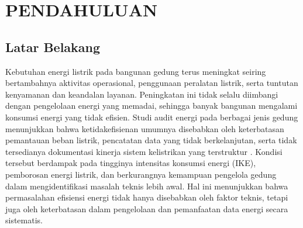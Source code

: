\chapter{PENDAHULUAN}
\label{chap:pendahuluan}
\section{Latar Belakang}
Kebutuhan energi listrik pada bangunan gedung terus meningkat seiring bertambahnya aktivitas operasional, penggunaan peralatan listrik, serta tuntutan kenyamanan dan keandalan layanan. Peningkatan ini tidak selalu diimbangi dengan pengelolaan energi yang memadai, sehingga banyak bangunan mengalami konsumsi energi yang tidak efisien. Studi audit energi pada berbagai jenis gedung menunjukkan bahwa ketidakefisienan umumnya disebabkan oleh keterbatasan pemantauan beban listrik, pencatatan data yang tidak berkelanjutan, serta tidak tersedianya dokumentasi kinerja sistem kelistrikan yang terstruktur \cite{hamdani2017audit,winarto2019audit}. Kondisi tersebut berdampak pada tingginya intensitas konsumsi energi (IKE), pemborosan energi listrik, dan berkurangnya kemampuan pengelola gedung dalam mengidentifikasi masalah teknis lebih awal. Hal ini menunjukkan bahwa permasalahan efisiensi energi tidak hanya disebabkan oleh faktor teknis, tetapi juga oleh keterbatasan dalam pengelolaan dan pemanfaatan data energi secara sistematis.

